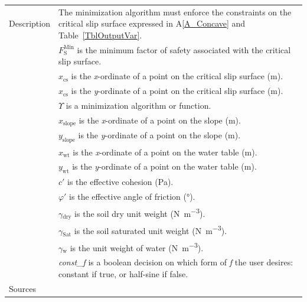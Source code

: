 \documentclass[12pt]{article}
\newcommand{\colAwidth}{0.13\textwidth}
\newcommand{\colBwidth}{0.82\textwidth}
\newcommand{\aref}[1]{A\ref{#1}}
\begin{document}
\begin{minipage}{\textwidth}
\begin{tabular}{| p{\colAwidth} | p{\colBwidth} |}
\hline Description & The minimization algorithm must enforce the constraints on 
the critical slip surface expressed in \aref{A_Concave} and 
Table~\ref{TblOutputVar}.\\
& $F_\text{S}^{\text{Min}}$ is the minimum factor of safety 
associated with the critical slip surface.\\
&$x_{\text{cs}}$ is the \textit{x}-ordinate of a point on the critical slip 
surface (\si{\meter}).\\
&$x_{\text{cs}}$ is the \textit{y}-ordinate of a point on the critical slip 
surface (\si{\meter}).\\
&$\Upsilon$ is a minimization algorithm or function.\\
&$x_{\text{slope}}$ is the \textit{x}-ordinate of a point on the slope 
(\si{\meter}).\\
&$y_{\text{slope}}$ is the \textit{y}-ordinate of a point on the slope 
(\si{\meter}).\\
&$x_{\text{wt}}$ is the \textit{x}-ordinate of a point on the water table 
(\si{\meter}).\\
&$y_{\text{wt}}$ is the \textit{y}-ordinate of a point on the water table 
(\si{\meter}).\\
&$c'$ is the effective cohesion (\si{\pascal}).\\
&$\varphi'$ is the effective angle of friction (\si{\degree}).\\
&$\gamma{}_{\text{dry}}$ is the soil dry unit weight 
(\si{\newton\per\meter\cubed}).\\
&${\gamma{}_{\text{Sat}}}$ is the soil saturated unit weight 
(\si{\newton\per\meter\cubed}).\\
&${\gamma{}_{\text{w}}}$ is the unit weight of water
(\si{\newton\per\meter\cubed}).\\
&\textit{const\_f} is a boolean decision on which form of \textit{f} 
the user desires: constant if true, or half-sine if false.\\

\hline Sources& \cite{LiEtAl}\\
\hline
\end{tabular}
\end{minipage}\\


\end{document}
